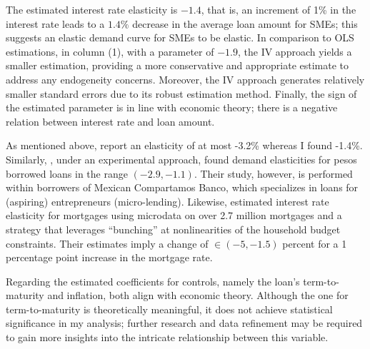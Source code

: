 \documentclass[11pt, oneside]{book}
\begin{document}
The estimated interest rate elasticity is $-1.4$, that is, an increment of 1\% in the interest rate leads to a $1.4\%$ decrease in the average loan amount for SMEs; this suggests an elastic demand curve for SMEs to be elastic. In comparison to OLS estimations, in column (1), with a parameter of $-1.9$, the IV approach yields a smaller estimation, providing a more conservative and appropriate estimate to address any endogeneity concerns. Moreover, the IV approach generates relatively smaller standard errors due to its robust estimation method. Finally, the sign of the estimated parameter is in line with economic theory; there is a negative relation between interest rate and loan amount. 

As mentioned above, \cite{IOANNIDOU202293} report an elasticity of at most -3.2\% whereas I found -1.4\%. Similarly,  \cite{karlan2019long},  under an experimental approach, found demand elasticities for pesos borrowed loans in the range  $ (-2.9, -1.1) $. Their study, however, is performed within borrowers of Mexican Compartamos Banco, which specializes in loans for (aspiring) entrepreneurs (micro-lending). Likewise, \cite{defusco2017interest} estimated  interest rate elasticity for mortgages using microdata on over 2.7 million mortgages and a strategy that leverages  ``bunching'' at nonlinearities of the household budget constraints. Their estimates imply a change of $\in (-5, -1.5)$ percent for a 1 percentage point increase in the mortgage rate. 


Regarding the estimated coefficients for controls, namely the loan's term-to-maturity and inflation, both align with economic theory. Although the one for term-to-maturity is theoretically meaningful, it does not achieve statistical significance in my analysis; further research and data refinement may be required to gain more insights into the intricate relationship between this variable.


\end{document}

